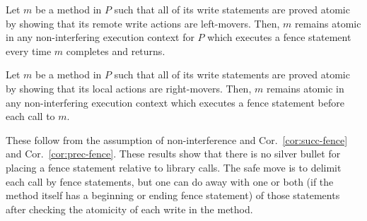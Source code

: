 \begin{theorem}
Let $m$ be a method in $P$ such that all of its write statements are proved atomic by showing that its remote write actions are left-movers.
Then, $m$ remains atomic in any non-interfering execution context for $P$ which executes a fence statement every time $m$ completes and returns.
\end{theorem}
\begin{theorem}
Let $m$ be a method in $P$ such that all of its write statements are proved atomic by showing that its local actions are right-movers.
Then, $m$ remains atomic in any non-interfering execution context which executes a fence statement before each call to $m$.
\end{theorem}
These follow from the assumption of non-interference and Cor.~\ref{cor:succ-fence} and Cor.~\ref{cor:prec-fence}.
These results show that there is no silver bullet for placing a fence statement relative to library calls. 
The safe move is to delimit each call by fence statements, but one can do away with one or both (if the method itself has a beginning or ending fence statement) of those statements after checking the atomicity of each write in the method.

